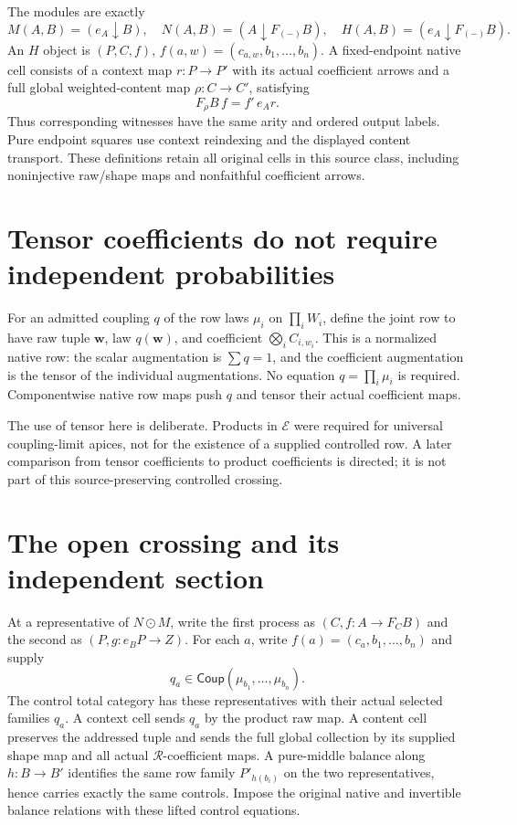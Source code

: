 \documentclass[11pt]{article}
\begin{document}
The modules are exactly
\[
 M(A,B)=(e_A\downarrow B),\quad N(A,B)=(A\downarrow F_{(-)}B),\quad
 H(A,B)=(e_A\downarrow F_{(-)}B).
\]
An $H$ object is $(P,C,f)$, $f(a,w)=(c_{a,w},b_1,\ldots,b_n)$. A fixed-endpoint native cell consists of a context map $r:P\to P'$ with its actual coefficient arrows and a full global weighted-content map $\rho:C\to C'$, satisfying
\[
 F_\rho B\,f=f'\,e_Ar.
\]
Thus corresponding witnesses have the same arity and ordered output labels. Pure endpoint squares use context reindexing and the displayed content transport. These definitions retain all original cells in this source class, including noninjective raw/shape maps and nonfaithful coefficient arrows.

\section{Tensor coefficients do not require independent probabilities}
For an admitted coupling $q$ of the row laws $\mu_i$ on $\prod_iW_i$, define the joint row to have raw tuple $\mathbf w$, law $q(\mathbf w)$, and coefficient $\bigotimes_i C_{i,w_i}$. This is a normalized native row: the scalar augmentation is $\sum q=1$, and the coefficient augmentation is the tensor of the individual augmentations. No equation $q=\prod_i\mu_i$ is required. Componentwise native row maps push $q$ and tensor their actual coefficient maps.

The use of tensor here is deliberate. Products in $\mathcal E$ were required for universal coupling-limit apices, not for the existence of a supplied controlled row. A later comparison from tensor coefficients to product coefficients is directed; it is not part of this source-preserving controlled crossing.

\section{The open crossing and its independent section}
At a representative of $N\odot M$, write the first process as $(C,f:A\to F_CB)$ and the second as $(P,g:e_BP\to Z)$. For each $a$, write $f(a)=(c_a,b_1,\ldots,b_n)$ and supply
\[
 q_a\in\mathsf{Coup}(\mu_{b_1},\ldots,\mu_{b_n}).
\]
The control total category has these representatives with their actual selected families $q_a$. A context cell sends $q_a$ by the product raw map. A content cell preserves the addressed tuple and sends the full global collection by its supplied shape map and all actual $\mathcal R$-coefficient maps. A pure-middle balance along $h:B\to B'$ identifies the same row family $P'_{h(b_i)}$ on the two representatives, hence carries exactly the same controls. Impose the original native and invertible balance relations with these lifted control equations.
\end{document}
